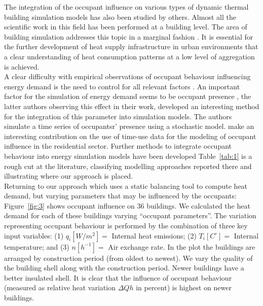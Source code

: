 \documentclass[11pt]{IJM-article}
\begin{document}
The integration of the occupant influence on various types of dynamic thermal
building simulation models has also been studied by others. Almost all the
scientific work in this field has been performed at a building level. The area
of building simulation addresses this topic in a marginal fashion
. It is essential for the further development of heat
supply infrastructure in urban environments that a clear understanding of heat
consumption patterns at a low level of aggregation is achieved.\\

A clear difficulty with empirical observations of occupant behaviour
influencing energy demand is the need to control for all relevant factors
. An important factor for the simulation of energy demand seems
to be occupant presence , the latter authors observing
this effect in their work,  developed an interesting method
for the integration of this parameter into simulation models.  The authors
simulate a time series of occupantsr' presence using a stochastic model.
 make an interesting contribution on the use of time-use data
for the modeling of occupant influence in the residential sector. Further
methods to integrate occupant behaviour into energy simulation models have been
developed  Table~\ref{tab:1} is a rough cut at the literature, classifying
modelling approaches reported there and illustrating where our approach is
placed.\\

Returning to our approach which uses a static balancing tool to compute heat
demand, but varying parameters that may be influenced by the occupants:
Figure~\ref{fig:3} shows occupant influence on 36 buildings.  We calculated the
heat demand for each of these buildings varying ``occupant parameters''. The
variation representing occupant behaviour is performed by the combination of
three key input variables: (1) $q_i[W/m^2] = $ Internal heat emissions; (2)
$T_i[C^\circ] = $ Internal temperature; and (3) $n[h^{-1}] = $ Air exchange
rate. In the plot the buildings are arranged by construction period (from
oldest to newest). We vary the quality of the building shell along with the
construction period. Newer buildings have a better insulated shell. It is clear
that the influence of occupant behaviour (measured as relative heat variation
$\Delta Qh$ in percent) is highest on newer buildings.\\
\end{document}
